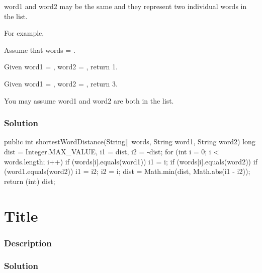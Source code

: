 word1 and word2 may be the same and they represent two individual words in the list.

For example,

Assume that words = .

Given word1 = , word2 = , return 1.

Given word1 = , word2 = , return 3.


You may assume word1 and word2 are both in the list.
\subsubsection{Solution}

\begin{Code}
public int shortestWordDistance(String[] words, String word1, String word2) {
    long dist = Integer.MAX_VALUE, i1 = dist, i2 = -dist;
    for (int i = 0; i < words.length; i++) {
        if (words[i].equals(word1))
            i1 = i;
        if (words[i].equals(word2)) {
            if (word1.equals(word2))
                i1 = i2;
            i2 = i;
        }
        dist = Math.min(dist, Math.abs(i1 - i2));
    }
    return (int) dist;
}
\end{Code}

\newpage

\section{Title} %

\subsubsection{Description}

\subsubsection{Solution}

\begin{Code}

\end{Code}

\newpage